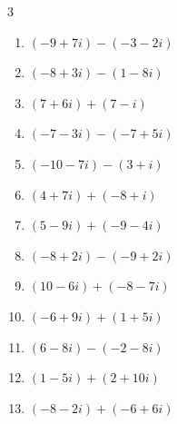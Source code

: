 \begin{multicols}{3}
\begin{enumerate}
        \phantom{$\displaystyle =17-4i$}

  \item $\displaystyle (-9+7i) - (-3-2i)$

        \phantom{$\displaystyle =-6+9i$}

  \item $\displaystyle (-8+3i) - (1-8i)$

        \phantom{$\displaystyle =-9+11i$}

  \item $\displaystyle (7+6i) + (7-i)$

        \phantom{$\displaystyle =14+5i$}

  \item $\displaystyle (-7-3i) - (-7+5i)$

        \phantom{$\displaystyle =-8i$}

  \item $\displaystyle (-10-7i) - (3+i)$

        \phantom{$\displaystyle =-13-8i$}

  \item $\displaystyle (4+7i) + (-8+i)$

        \phantom{$\displaystyle =-4+8i$}

  \item $\displaystyle (5-9i) + (-9-4i)$

        \phantom{$\displaystyle =-4-13i$}

  \item $\displaystyle (-8+2i) - (-9+2i)$

        \phantom{$\displaystyle =1$}

  \item $\displaystyle (10-6i) + (-8-7i)$

        \phantom{$\displaystyle =2-13i$}

  \item $\displaystyle (-6+9i) + (1+5i)$

        \phantom{$\displaystyle =-5+14i$}

  \item $\displaystyle (6-8i) - (-2-8i)$

        \phantom{$\displaystyle =8$}

  \item $\displaystyle (1-5i) + (2+10i)$

        \phantom{$\displaystyle =3+5i$}

  \item $\displaystyle (-8-2i) + (-6+6i)$


\end{enumerate}
\end{multicols}
